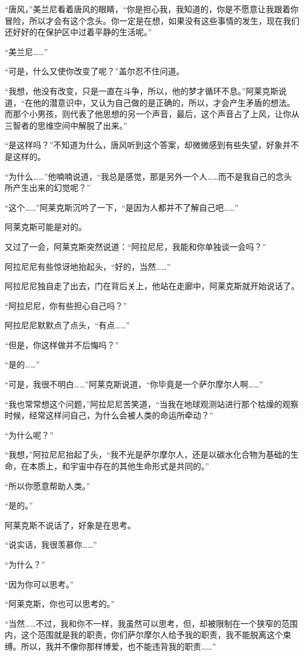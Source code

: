 “唐风，”美兰尼看着唐风的眼睛，“你是担心我，我知道的，你是不愿意让我跟着你冒险，所以才会有这个念头。你一定是在想，如果没有这些事情的发生，现在我们还好好的在保护区中过着平静的生活呢。” 

“美兰尼……” 

“可是，什么又使你改变了呢？”盖尔忍不住问道。 

“我想，他没有改变，只是一直在斗争，所以，他的梦才循环不息。”阿莱克斯说道，“在他的潜意识中，又认为自己做的是正确的，所以，才会产生矛盾的想法。而那个小男孩，则代表了他思想的另一个声音，最后，这个声音占了上风，让你从三智者的思维空间中解脱了出来。” 

“是这样吗？”不知道为什么，唐风听到这个答案，却微微感到有些失望，好象并不是这样的。 

“为什么……”他喃喃说道，“我总是感觉，那是另外一个人……而不是我自己的念头所产生出来的幻觉呢？” 

“这个……”阿莱克斯沉吟了一下，“是因为人都并不了解自己吧……” 

阿莱克斯可能是对的。 

又过了一会，阿莱克斯突然说道：“阿拉尼尼，我能和你单独谈一会吗？” 

阿拉尼尼有些惊讶地抬起头，“好的，当然……” 

阿拉尼尼独自走了出去，门在背后关上，他站在走廊中，阿莱克斯就开始说话了。 

“阿拉尼尼，你有些担心自己吗？” 

阿拉尼尼默默点了点头，“有点……” 

“但是，你这样做并不后悔吗？” 

“是的……” 

“可是，我很不明白……”阿莱克斯说道，“你毕竟是一个萨尔摩尔人啊……” 

“我也常常想这个问题，”阿拉尼尼苦笑道，“当我在地球观测站进行那个枯燥的观察时候，经常这样问自己，为什么会被人类的命运所牵动？” 

“为什么呢？” 

“我想，”阿拉尼尼抬起了头，“我不光是萨尔摩尔人，还是以碳水化合物为基础的生命，在本质上，和宇宙中存在的其他生命形式是共同的。” 

“所以你愿意帮助人类。” 

“是的。” 

阿莱克斯不说话了，好象是在思考。 

“说实话，我很羡慕你……” 

“为什么？” 

“因为你可以思考。” 

“阿莱克斯，你也可以思考的。” 

“当然……不过，我和你不一样，我虽然可以思考，但，却被限制在一个狭窄的范围内，这个范围就是我的职责，你们萨尔摩尔人给予我的职责，我不能脱离这个束缚。所以，我并不像你那样博爱，也不能违背我的职责……” 

